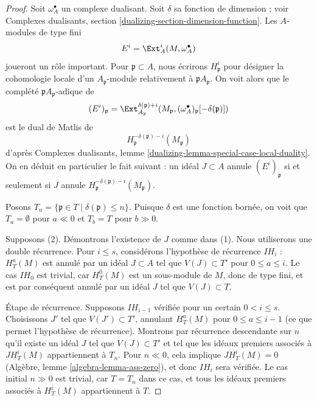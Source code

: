 \begin{proof}
Soit $\omega_A^\bullet$ un complexe dualisant. Soit $\delta$ sa fonction de dimension ; voir Complexes dualisants, section \ref{dualizing-section-dimension-function}. Les $A$-modules de type fini
$$
E^i = \Ext_A^i(M, \omega_A^\bullet)
$$
joueront un rôle important. Pour $\mathfrak p \subset A$, nous écrirons $H^i_\mathfrak p$ pour désigner la cohomologie locale d'un $A_\mathfrak p$-module relativement à $\mathfrak pA_\mathfrak p$. On voit alors que le complété $\mathfrak pA_\mathfrak p$-adique de
$$
(E^i)_\mathfrak p =
\Ext^{\delta(\mathfrak p) + i}_{A_\mathfrak p}(M_\mathfrak p,
(\omega_A^\bullet)_\mathfrak p[-\delta(\mathfrak p)])
$$
est le dual de Matlis de
$$
H^{-\delta(\mathfrak p) - i}_{\mathfrak p}(M_\mathfrak p)
$$
d'après Complexes dualisants, lemme \ref{dualizing-lemma-special-case-local-duality}. On en déduit en particulier le fait suivant : un idéal $J \subset A$ annule $(E^i)_\mathfrak p$ si et seulement si $J$ annule $H^{-\delta(\mathfrak p) - i}_{\mathfrak p}(M_\mathfrak p)$.

\medskip\noindent
Posons $T_n = \{\mathfrak p \in T \mid \delta(\mathfrak p) \leq n\}$. Puisque $\delta$ est une fonction bornée, on voit que $T_a = \emptyset$ pour $a \ll 0$ et $T_b = T$ pour $b \gg 0$.

\medskip\noindent
Supposons (2). Démontrons l'existence de $J$ comme dans (1). Nous utiliserons une double récurrence. Pour $i \leq s$, considérons l'hypothèse de récurrence $IH_i$ : $H^a_T(M)$ est annulé par un idéal $J \subset A$ tel que $V(J) \subset T'$ pour $0 \leq a \leq i$. Le cas $IH_0$ est trivial, car $H^0_T(M)$ est un sous-module de $M$, donc de type fini, et est par conséquent annulé par un idéal $J$ tel que $V(J) \subset T$.

\medskip\noindent
Étape de récurrence. Supposons $IH_{i - 1}$ vérifiée pour un certain $0 < i \leq s$. Choisissons $J'$ tel que $V(J') \subset T'$, annulant $H^a_T(M)$ pour $0 \leq a \leq i - 1$ (ce que permet l'hypothèse de récurrence). Montrons par récurrence descendante sur $n$ qu'il existe un idéal $J$ tel que $V(J) \subset T'$ et tel que les idéaux premiers associés à $J H^i_T(M)$ appartiennent à $T_n$. Pour $n \ll 0$, cela implique $JH^i_T(M) = 0$ (Algèbre, lemme \ref{algebra-lemma-ass-zero}), et donc $IH_i$ sera vérifiée. Le cas initial $n \gg 0$ est trivial, car $T = T_n$ dans ce cas, et tous les idéaux premiers associés à $H^i_T(M)$ appartiennent à $T$.


\end{proof}
